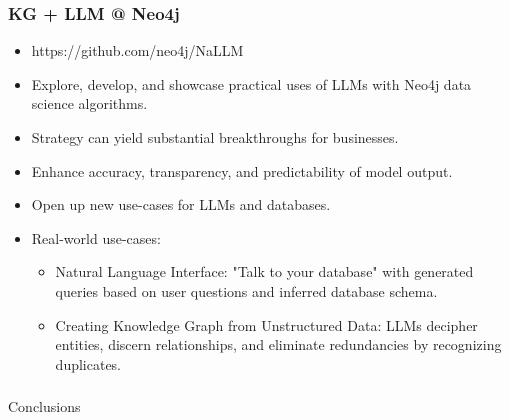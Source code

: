 \begin{frame}[fragile]\frametitle{KG + LLM @ Neo4j}
\begin{itemize}
\item https://github.com/neo4j/NaLLM
\item Explore, develop, and showcase practical uses of LLMs with Neo4j data science algorithms.
\item Strategy can yield substantial breakthroughs for businesses.
\item Enhance accuracy, transparency, and predictability of model output.
\item Open up new use-cases for LLMs and databases.
\item Real-world use-cases:

	\begin{itemize}
	\item Natural Language Interface: "Talk to your database" with generated queries based on user questions and inferred database schema.
	\item Creating Knowledge Graph from Unstructured Data: LLMs decipher entities, discern relationships, and eliminate redundancies by recognizing duplicates.
	\end{itemize}

\end{itemize}
\end{frame}


\begin{frame}[fragile]\frametitle{}
\begin{center}
{\Large Conclusions}

\end{center}
\end{frame}

